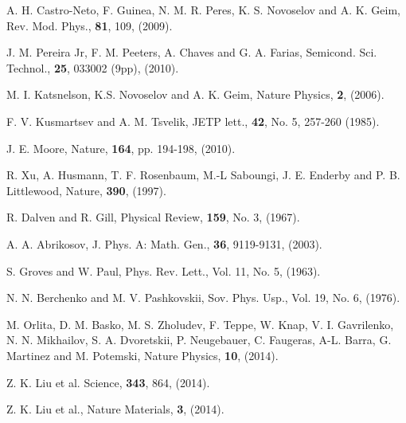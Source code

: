 \documentclass[prb,twocolumn,aps,superscriptaddress,showpacs,floatfix]{revtex4}
\begin{document}
\begin{thebibliography}{10}

A. H. Castro-Neto, F. Guinea, N. M. R. Peres, K. S. Novoselov and A. K. Geim,
\newblock Rev. Mod. Phys., {\bf 81}, 109, (2009).

J. M. Pereira Jr, F. M. Peeters, A. Chaves and G. A. Farias,
\newblock Semicond. Sci. Technol., {\bf 25}, 033002 (9pp), (2010).

M. I. Katsnelson, K.S. Novoselov and A. K. Geim,
\newblock Nature Physics, {\bf 2}, (2006).

F. V. Kusmartsev and A. M. Tsvelik,
\newblock JETP lett., {\bf 42}, No. 5, 257-260 (1985).

 J. E. Moore, %
Nature, {\bf164}, pp. 194-198, (2010).

R. Xu, A. Husmann, T. F. Rosenbaum, M.-L Saboungi, J. E. Enderby and P. B. Littlewood,
Nature, {\bf 390}, (1997).

R. Dalven and R. Gill,
Physical Review, {\bf 159}, No. 3, (1967).

A. A. Abrikosov,
J. Phys. A: Math. Gen., {\bf 36}, 9119-9131, (2003).

S. Groves and W. Paul,
Phys. Rev. Lett., Vol. 11, No. 5, (1963).

N. N. Berchenko and M. V. Pashkovskii,
Sov. Phys. Usp., Vol. 19, No. 6, (1976).

M. Orlita, D. M. Basko, M. S. Zholudev, F. Teppe, W. Knap, V. I. Gavrilenko, N. N. Mikhailov, S. A. Dvoretskii, P. Neugebauer, C. Faugeras, A-L. Barra, G. Martinez and M. Potemski,
Nature Physics, {\bf 10}, (2014).

Z. K. Liu et al.
Science, {\bf 343}, 864, (2014).

Z. K. Liu et al.,
Nature Materials, {\bf 3}, (2014).


\end{thebibliography}
\end{document}
